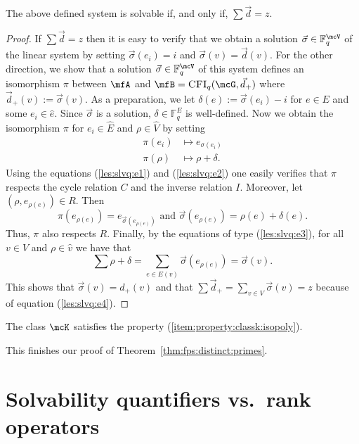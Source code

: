 \documentclass[a4paper,UKenglish]{lipics}
\newcommand{\defeq}{:=}
\newcommand{\field}[1]{\mathbb{#1}}
\theoremstyle{plain}
\begin{document}
\begin{lemma}
 The above defined system is solvable if, and only if, 
 $\sum \vec d = z$.
\end{lemma}
\begin{proof}
 If $\sum \vec d = z$ then it is easy to verify that we obtain a solution 
$\vec \sigma \in \field F_q^{\mcV}$ of the linear system by setting $\vec 
\sigma(e_i) = i$ and $\vec \sigma(v) = \vec d(v)$.
For the other direction, we show that a solution $\vec \sigma \in \field 
F_q^\mcV$ of 
this system defines an isomorphism $\pi$ between $\mfA$ and $\mfB = 
\CFI(\mcG,\vec d_+)$ where $\vec d_+(v) \defeq \vec \sigma (v)$. 
As a preparation, we let $\delta(e) \defeq \vec \sigma(e_{i}) - i$ for $e \in 
E$ and some $e_i \in \hat e$. Since $\vec \sigma$ is a solution, $\delta \in 
\field F_q^E$ is well-defined.
Now we obtain the isomorphism $\pi$ for $e_i \in \hat E$ and $\rho \in 
\hat V$ by setting
\begin{align*}
 \pi(e_i) &\mapsto e_{\sigma(e_i)} \\
 \pi(\rho) &\mapsto \rho + \delta.
\end{align*}
Using the equations (\ref{les:slvq:e1}) and (\ref{les:slvq:e2}) one 
easily verifies that $\pi$ respects the cycle relation $C$ and the inverse 
relation $I$.
Moreover, let $(\rho, e_{\rho(e)}) \in R$. Then 
\[ \pi(e_{\rho(e)}) = e_{\vec \sigma(e_{\rho(e)})}
\text{ and } \vec \sigma(e_{\rho(e)}) = \rho(e) + \delta(e).
\]
Thus, $\pi$ also respects $R$.
Finally, by the equations of type (\ref{les:slvq:e3}),  for all $v \in V$ and 
$\rho \in \hat v$ we have that
\[ \sum \rho + \delta = \sum_{e \in E(v)} \vec 
\sigma(e_{\rho(e)}) = \vec \sigma(v).\]
This shows that $\vec \sigma(v) = d_+(v)$ and that $\sum \vec d_+ = \sum_{v \in 
V} \vec \sigma (v) = z$ because of equation (\ref{les:slvq:e4}).
\end{proof}


\begin{lemma} \label{lemma:slv:classk:prop:3}
The class $\mcK$ satisfies the property
(\ref{item:property:classk:isopoly}).
\end{lemma}

This finishes our proof of Theorem~\ref{thm:fps:distinct:primes}.



\section{Solvability quantifiers vs.\ rank operators}
\label{sec:slv:rk}
\end{document}
